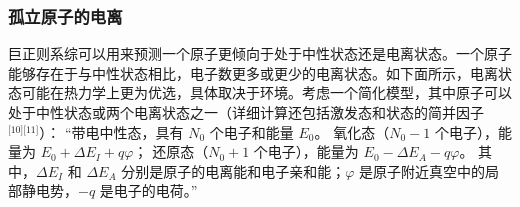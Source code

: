 \subsubsection{孤立原子的电离}
巨正则系综可以用来预测一个原子更倾向于处于中性状态还是电离状态。一个原子能够存在于与中性状态相比，电子数更多或更少的电离状态。如下面所示，电离状态可能在热力学上更为优选，具体取决于环境。考虑一个简化模型，其中原子可以处于中性状态或两个电离状态之一（详细计算还包括激发态和状态的简并因子\(^\text{[10][11]}\)）：
“带电中性态，具有 \( N_0 \) 个电子和能量 \( E_0 \)。
氧化态（\( N_0 - 1 \) 个电子），能量为 \( E_0 + \Delta E_I + q\varphi \)；
还原态（\( N_0 + 1 \) 个电子），能量为 \( E_0 - \Delta E_A - q\varphi \)。
其中，\( \Delta E_I \) 和 \( \Delta E_A \) 分别是原子的电离能和电子亲和能；\( \varphi \) 是原子附近真空中的局部静电势，\( -q \) 是电子的电荷。”